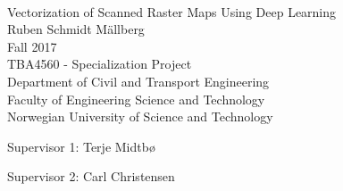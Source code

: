 
\thispagestyle{empty}
\mbox{}\\[6pc]
\begin{center}
\Huge{Vectorization of Scanned Raster Maps Using Deep Learning}\\[2pc]

\Large{Ruben Schmidt Mällberg}\\[1pc]
\large{Fall 2017}\\[2pc]

TBA4560 - Specialization Project\\
Department of Civil and Transport Engineering \\
Faculty of Engineering Science and Technology\\
Norwegian University of Science and Technology
\end{center}
\vfill

\noindent Supervisor 1: Terje Midtbø

\noindent Supervisor 2: Carl Christensen

